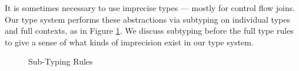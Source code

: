 It is sometimes necessary to use imprecise types --- mostly for control flow joins.  Our type system performs these abstractions via subtyping on individual types and full contexts, as in Figure \ref{fig:sub-typing}.  We discuss subtyping before the full type rules to give a sense of what kinds of imprecision exist in our type system.
\begin{figure}[!t]\scriptsize
\begin{mdframed}
\vspace{-2em}
\caption{Sub-Typing Rules}
\label{fig:sub-typing}
\end{mdframed}
\end{figure}

